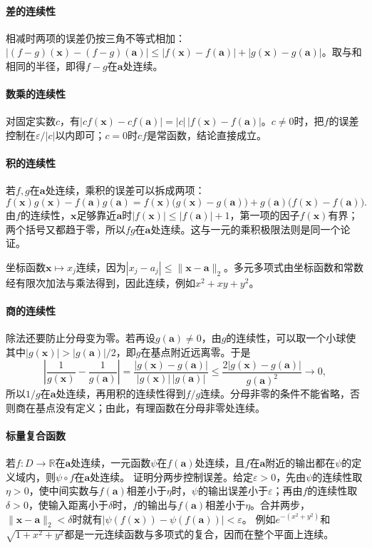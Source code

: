 \paragraph{差的连续性}
相减时两项的误差仍按三角不等式相加：$|(f-g)(\bm x)-(f-g)(\bm a)|\leq|f(\bm x)-f(\bm a)|+|g(\bm x)-g(\bm a)|$。取与和相同的半径，即得$f-g$在$\bm a$处连续。

\paragraph{数乘的连续性}
对固定实数$c$，有$|cf(\bm x)-cf(\bm a)|=|c|\,|f(\bm x)-f(\bm a)|$。$c\neq0$时，把$f$的误差控制在$\varepsilon/|c|$以内即可；$c=0$时$cf$是常函数，结论直接成立。

\paragraph{积的连续性}
若$f,g$在$\bm a$处连续，乘积的误差可以拆成两项：
\[
 f(\bm x)g(\bm x)-f(\bm a)g(\bm a)
 =f(\bm x)\bigl(g(\bm x)-g(\bm a)\bigr)+g(\bm a)\bigl(f(\bm x)-f(\bm a)\bigr).
\]
由$f$的连续性，$\bm x$足够靠近$\bm a$时$|f(\bm x)|\leq|f(\bm a)|+1$，第一项的因子$f(\bm x)$有界；两个括号又都趋于零，所以$fg$在$\bm a$处连续。这与一元的乘积极限法则是同一个论证。

坐标函数$\bm x\mapsto x_j$连续，因为$|x_j-a_j|\leq\lVert\bm x-\bm a\rVert_2$。多元多项式由坐标函数和常数经有限次加法与乘法得到，因此连续，例如$x^2+xy+y^2$。

\paragraph{商的连续性}
除法还要防止分母变为零。若再设$g(\bm a)\neq0$，由$g$的连续性，可以取一个小球使其中$|g(\bm x)|>|g(\bm a)|/2$，即$g$在基点附近远离零。于是
\[
 \left|\frac1{g(\bm x)}-\frac1{g(\bm a)}\right|
 =\frac{|g(\bm x)-g(\bm a)|}{|g(\bm x)|\,|g(\bm a)|}
 \leq\frac{2|g(\bm x)-g(\bm a)|}{g(\bm a)^2}\longrightarrow0,
\]
所以$1/g$在$\bm a$处连续，再用积的连续性得到$f/g$连续。分母非零的条件不能省略，否则商在基点没有定义；由此，有理函数在分母非零处连续。

\paragraph{标量复合函数}
若$f:D\to\mathbb R$在$\bm a$处连续，一元函数$\psi$在$f(\bm a)$处连续，且$f$在$\bm a$附近的输出都在$\psi$的定义域内，则$\psi\circ f$在$\bm a$处连续。
证明分两步控制误差。给定$\varepsilon>0$，先由$\psi$的连续性取$\eta>0$，使中间实数与$f(\bm a)$相差小于$\eta$时，$\psi$的输出误差小于$\varepsilon$；再由$f$的连续性取$\delta>0$，使输入距离小于$\delta$时，$f$的输出与$f(\bm a)$相差小于$\eta$。合并两步，$\lVert\bm x-\bm a\rVert_2<\delta$时就有$|\psi(f(\bm x))-\psi(f(\bm a))|<\varepsilon$。
例如$e^{-(x^2+y^2)}$和$\sqrt{1+x^2+y^2}$都是一元连续函数与多项式的复合，因而在整个平面上连续。

